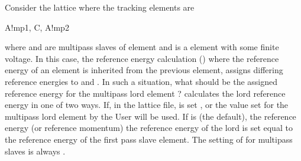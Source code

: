 Consider the lattice where the tracking elements are
\begin{example}
  A!mp1, C, A!mp2
\end{example}
where  and  are multipass slaves of element  and  is a 
element with some finite voltage. In this case, the reference energy calculation ()
where the reference energy of an element is inherited from the previous element, assigns differing
reference energies to  and . In such a situation, what should be the assigned
reference energy for the multipass lord element ? \accellat calculates the lord reference energy
in one of two ways. If, in the lattice file,  is set , 
 or  the value set for the multipass lord element by the User will be used.
If  is  (the default), 
the reference energy (or reference momentum) the reference energy of the lord is set equal to the 
reference energy of the first pass slave element. 
The setting of  for multipass slaves is always .
